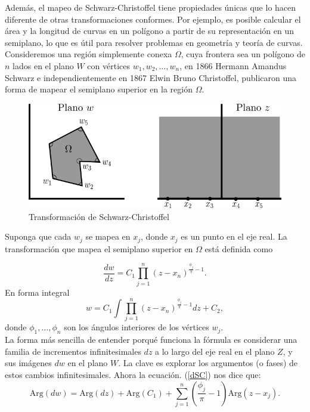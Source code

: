 Además, el mapeo de Schwarz-Christoffel tiene propiedades únicas que lo hacen diferente de otras transformaciones conformes. Por ejemplo, es posible calcular el área y la longitud de curvas en un polígono a partir de su representación en un semiplano, lo que es útil para resolver problemas en geometría y teoría de curvas.
Consideremos una región simplemente conexa $\Omega$, cuya frontera sea un polígono de $n$ lados en el plano $W$ con vértices $w_1,w_2,\ldots,w_n$, en 1866 Hermann Amandus Schwarz e independientemente en 1867  Elwin Bruno Christoffel, publicaron una forma de mapear  el semiplano superior en  la región $\Omega$.
\begin{figure}[h!]
	\centering
	\includegraphics[width=0.7\linewidth]{img/sc}
	\caption{Transformación de Schwarz-Christoffel}
	\label{fig:sc}
\end{figure}
Suponga que cada $w_j$ se mapea en $x_j$, donde $x_j$ es un punto en el eje real.
La transformación que mapea el semiplano superior en   $\Omega$ está definida  como 

\begin{equation}\label{dSC}
	\dfrac{dw}{dz}=C_1\prod_{j=1}^{n}(z-x_n)^{\frac{\phi_j}{\pi}-1}.
\end{equation}
En forma integral
\begin{equation}\label{eSC}
	w=C_1\int \prod_{j=1}^{n}(z-x_n)^{\frac{\phi_j}{\pi}-1} dz +C_2,
\end{equation}
donde $\phi_1,\ldots,\phi_n$ son los ángulos interiores de los vértices $w_j$.\\
La forma más sencilla de entender porqué funciona la fórmula es considerar una familia de incrementos infinitesimales $dz$ a lo largo del eje real en el plano $Z$, y sus imágenes $dw$ en el plano $W$. La clave es explorar los argumentos (o fases) de estos cambios infinitesimales. Ahora la ecuación. (\ref{dSC}) nos dice que:
\begin{equation}\label{SC1}
	\mbox{Arg}(dw)=\mbox{Arg}(dz)+\mbox{Arg}(C_1)+\sum_{j=1}^{n}\left(\dfrac{\phi_j}{\pi}-1\right)\mbox{Arg}(z-x_j).
\end{equation}

